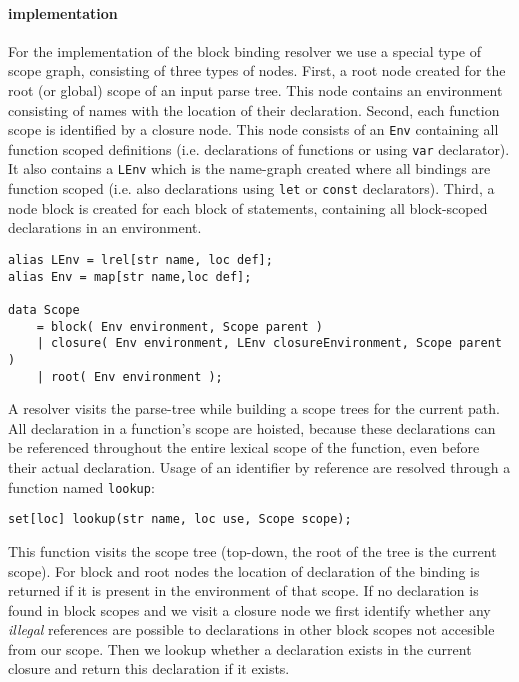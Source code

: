 \paragraph{implementation}
For the implementation of the block binding resolver we use a special type of scope graph, consisting of three types of nodes. First, a root node created for the root (or global) scope of an input parse tree. This node contains an environment consisting of names with the location of their declaration. Second, each function scope is identified by a closure node. This node consists of an \lstinline$Env$ containing all function scoped definitions (i.e. declarations of functions or using \lstinline$var$ declarator). It also contains a \lstinline$LEnv$ which is the name-graph created where all bindings are function scoped (i.e. also declarations using \lstinline$let$ or \lstinline$const$ declarators). Third, a node block is created for each block of statements, containing all block-scoped declarations in an environment.

\begin{lstlisting}[caption=Data structure for scope graph,language=rascal]
alias LEnv = lrel[str name, loc def];
alias Env = map[str name,loc def];

data Scope 
	= block( Env environment, Scope parent )
	| closure( Env environment, LEnv closureEnvironment, Scope parent )
	| root( Env environment );
\end{lstlisting}

A resolver visits the parse-tree while building a scope trees for the current path. All declaration in a function's scope are hoisted, because these declarations can be referenced throughout the entire lexical scope of the function, even before their actual declaration. Usage of an identifier by reference are resolved through a function named \lstinline$lookup$:

\begin{lstlisting}[language=rascal]
set[loc] lookup(str name, loc use, Scope scope);
\end{lstlisting}

This function visits the scope tree (top-down, the root of the tree is the current scope). For block and root nodes the location of declaration of the binding is returned if it is present in the environment of that scope. If no declaration is found in block scopes and we visit a closure node we first identify whether any \textit{illegal} references are possible to declarations in other block scopes not accesible from our scope. Then we lookup whether a declaration exists in the current closure and return this declaration if it exists.

